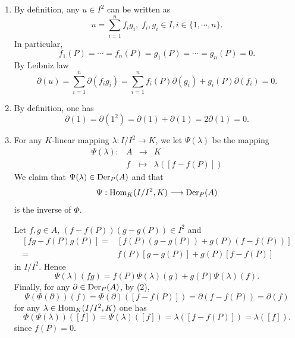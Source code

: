 \begin{proofenv}
    \quad 
    \begin{enumerate}[label=(\arabic*)]
        \item By definition, any $u \in I^2$ can be written as
            $$u = \sum_{i=1}^{n} f_i g_i,\;f_i,g_i \in I,i\in\{1,\cdots,n\}.$$
            In particular,
            $$f_1(P) = \cdots = f_n(P) = g_1(P) = \cdots = g_n(P) = 0.$$
            By Leibniz law
            $$\partial(u) = \sum_{i=1}^{n} \partial(f_i g_i) = \sum_{i=1}^{n} f_i(P) \partial(g_i) + g_i(P) \partial(f_i) = 0.$$
        \item By definition, one has 
            $$\partial(1) = \partial(1^2) = \partial(1) + \partial(1) = 2 \partial(1) = 0.$$
        \item For any $K$-linear mapping $\lambda : I/I^2 \rightarrow K$, we let $\Psi(\lambda)$ be the mapping
            $$\begin{array}{rrcl}
                \Psi(\lambda) : & A & \longrightarrow & K\\
                & f & \longmapsto & \lambda([f - f(P)])
            \end{array}$$
            We claim that $\Psi(\lambda) \in \operatorname{\mathrm{Der}}_P(A)$ and that
            $$\Psi : \operatorname{\mathrm{Hom}}_{K}(I/I^2, K) \longrightarrow \operatorname{\mathrm{Der}}_P(A)$$
            is the inverse of $\Phi$.
            
            \quad Let $f,g \in A$, $(f-f(P))(g-g(P)) \in I^2$ and
            $$\begin{aligned}
                [fg - f(P)g(P)] = & [f(P)(g - g(P)) + g(P)(f-f(P))]\\
                = & f(P)[g - g(P)] + g(P)[f - f(P)]
            \end{aligned}$$
            in $I/I^2$.
            Hence
            $$\Psi(\lambda)(fg) = f(P)\Psi(\lambda)(g) + g(P)\Psi(\lambda)(f).$$
            Finally, for any $\partial \in \operatorname{\mathrm{Der}}_P(A)$, by (2),
            $$\Psi\left(\Phi(\partial)\right)(f) = \Phi(\partial)([f - f(P)]) = \partial(f - f(P)) = \partial(f)$$
            for any $\lambda \in \operatorname{\mathrm{Hom}}_{K}(I/I^2, K)$ one has
            $$\Phi(\Psi(\lambda))([f]) = \Psi(\lambda)([f]) = \lambda([f - f(P)]) = \lambda([f]).$$
            since $f(P) = 0$.
    \end{enumerate}
\end{proofenv}
